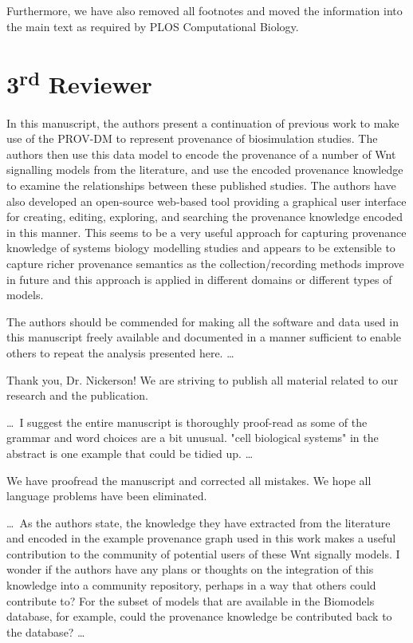 \documentclass{article}
\begin{document}
Furthermore, we have also removed all footnotes and moved the information into the main text as required by PLOS Computational Biology.


\section*{3\textsuperscript{rd} Reviewer}

\begin{mdframed}
In this manuscript, the authors present a continuation of previous work to make use of the PROV-DM to represent provenance of biosimulation studies.
The authors then use this data model to encode the provenance of a number of Wnt signalling models from the literature, and use the encoded provenance knowledge to examine the relationships between these published studies.
The authors have also developed an open-source web-based tool providing a graphical user interface for creating, editing, exploring, and searching the provenance knowledge encoded in this manner.
This seems to be a very useful approach for capturing provenance knowledge of systems biology modelling studies and appears to be extensible to capture richer provenance semantics as the collection/recording methods improve in future and this approach is applied in different domains or different types of models.

The authors should be commended for making all the software and data used in this manuscript freely available and documented in a manner sufficient to enable others to repeat the analysis presented here. \ldots
\end{mdframed}

Thank you, Dr. Nickerson!
We are striving to publish all material related to our research and the publication.

\begin{mdframed}
\ldots\, I suggest the entire manuscript is thoroughly proof-read as some of the grammar and word choices are a bit unusual. "cell biological systems" in the abstract is one example that could be tidied up. \ldots
\end{mdframed}

We have proofread the manuscript and corrected all mistakes.
We hope all language problems have been eliminated.

\begin{mdframed}
\ldots\, As the authors state, the knowledge they have extracted from the literature and encoded in the example provenance graph used in this work makes a useful contribution to the community of potential users of these Wnt signally models.
I wonder if the authors have any plans or thoughts on the integration of this knowledge into a community repository, perhaps in a way that others could contribute to?
For the subset of models that are available in the Biomodels database, for example, could the provenance knowledge be contributed back to the database? \ldots
\end{mdframed}
\end{document}
